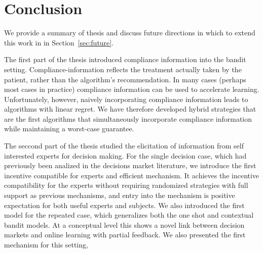 \chapter{Conclusion}
\label{cha:conc}

We provide a summary of thesis and discuss future directions in which to extend this work in in Section~\ref{sec:future}.




The first part of the thesis introduced compliance information into the bandit setting. 
Compliance-information reflects the treatment actually taken by the patient, rather than the algorithm's recommendation. 
In many cases (perhaps most cases in practice) compliance information can be used to accelerate learning. Unfortunately, however, naively incorporating compliance information leads to algorithms with linear regret.%
We have therefore developed hybrid strategies that are the first algorithms that simultaneously incorporate compliance information while maintaining a worst-case guarantee. 

The seccond part of the thesis studied the elicitation of information from self interested experts for decision making.
For the single decision case, which had previously been analized in the decisions market literature, we introduce the first incentive compatible for experts and efficient mechanism.
It achieves the incentive compatibility for the experts without requiring randomized strategies with full support as previous mechanisms, and entry into the mechanism is positive expectation for both useful experts and subjects.
We also introduced the first model for the repeated case, which generalizes both the one shot and contextual bandit models.
At a conceptual level this shows a novel link between decision markets and online learning with partial feedback.
We also presented the first mechanism for this setting, 




